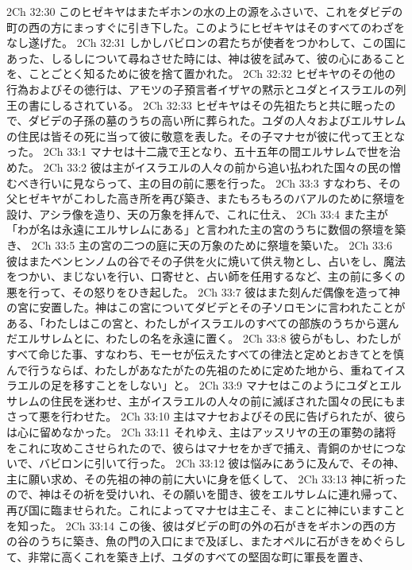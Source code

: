 2Ch 32:30  このヒゼキヤはまたギホンの水の上の源をふさいで、これをダビデの町の西の方にまっすぐに引き下した。このようにヒゼキヤはそのすべてのわざをなし遂げた。
2Ch 32:31  しかしバビロンの君たちが使者をつかわして、この国にあった、しるしについて尋ねさせた時には、神は彼を試みて、彼の心にあることを、ことごとく知るために彼を捨て置かれた。
2Ch 32:32  ヒゼキヤのその他の行為およびその徳行は、アモツの子預言者イザヤの黙示とユダとイスラエルの列王の書にしるされている。
2Ch 32:33  ヒゼキヤはその先祖たちと共に眠ったので、ダビデの子孫の墓のうちの高い所に葬られた。ユダの人々およびエルサレムの住民は皆その死に当って彼に敬意を表した。その子マナセが彼に代って王となった。
2Ch 33:1  マナセは十二歳で王となり、五十五年の間エルサレムで世を治めた。
2Ch 33:2  彼は主がイスラエルの人々の前から追い払われた国々の民の憎むべき行いに見ならって、主の目の前に悪を行った。
2Ch 33:3  すなわち、その父ヒゼキヤがこわした高き所を再び築き、またもろもろのバアルのために祭壇を設け、アシラ像を造り、天の万象を拝んで、これに仕え、
2Ch 33:4  また主が「わが名は永遠にエルサレムにある」と言われた主の宮のうちに数個の祭壇を築き、
2Ch 33:5  主の宮の二つの庭に天の万象のために祭壇を築いた。
2Ch 33:6  彼はまたベンヒンノムの谷でその子供を火に焼いて供え物とし、占いをし、魔法をつかい、まじないを行い、口寄せと、占い師を任用するなど、主の前に多くの悪を行って、その怒りをひき起した。
2Ch 33:7  彼はまた刻んだ偶像を造って神の宮に安置した。神はこの宮についてダビデとその子ソロモンに言われたことがある、「わたしはこの宮と、わたしがイスラエルのすべての部族のうちから選んだエルサレムとに、わたしの名を永遠に置く。
2Ch 33:8  彼らがもし、わたしがすべて命じた事、すなわち、モーセが伝えたすべての律法と定めとおきてとを慎んで行うならば、わたしがあなたがたの先祖のために定めた地から、重ねてイスラエルの足を移すことをしない」と。
2Ch 33:9  マナセはこのようにユダとエルサレムの住民を迷わせ、主がイスラエルの人々の前に滅ぼされた国々の民にもまさって悪を行わせた。
2Ch 33:10  主はマナセおよびその民に告げられたが、彼らは心に留めなかった。
2Ch 33:11  それゆえ、主はアッスリヤの王の軍勢の諸将をこれに攻めこさせられたので、彼らはマナセをかぎで捕え、青銅のかせにつないで、バビロンに引いて行った。
2Ch 33:12  彼は悩みにあうに及んで、その神、主に願い求め、その先祖の神の前に大いに身を低くして、
2Ch 33:13  神に祈ったので、神はその祈を受けいれ、その願いを聞き、彼をエルサレムに連れ帰って、再び国に臨ませられた。これによってマナセは主こそ、まことに神にいますことを知った。
2Ch 33:14  この後、彼はダビデの町の外の石がきをギホンの西の方の谷のうちに築き、魚の門の入口にまで及ぼし、またオペルに石がきをめぐらして、非常に高くこれを築き上げ、ユダのすべての堅固な町に軍長を置き、
